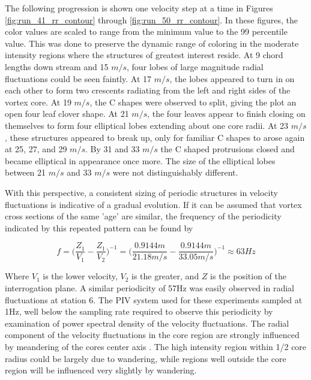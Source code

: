 The following progression is shown one velocity step at 
a time in Figures \ref{fig:run_41_rr_contour} through 
\ref{fig:run_50_rr_contour}. In these figures, the color values are scaled to 
range from the minimum value to the 99 percentile value. This was done to 
preserve the dynamic range of coloring in the moderate intensity regions where 
the structures of greatest interest reside.
At 9 chord lengths down stream and 15 $m/s$, four lobes of 
large magnitude radial fluctuations could be seen faintly. At 17 $m/s$, the 
lobes appeared to turn in on each other to form two crescents radiating from 
the left and right sides of the vortex core. At 19 $m/s$, the C shapes were 
observed to split, giving the plot an open four leaf clover shape. At 21 $m/s$, 
the four leaves appear to finish closing on themselves to form four 
elliptical lobes extending about one core radii. At 23 $m/s$, these 
structures appeared to break up, only for familiar C shapes to arose again at 
25, 27, and 29 $m/s$. By 31 and 33 $m/s$ the C shaped protrusions closed and 
became elliptical in appearance once more.  The size of the 
elliptical lobes between 21 $m/s$ and 33 $m/s$ were not distinguishably 
different. 












With this perspective, a consistent sizing of periodic structures in velocity 
fluctuations is indicative of a gradual evolution. If it can be assumed that 
vortex cross sections of the same 'age' are similar, the frequency of the 
periodicity indicated by this repeated pattern can be found by

\begin{equation}
f = \Big(\frac{Z_1}{V_1} - \frac{Z_1}{V_2}\Big)^{-1} = 
\Big(\frac{0.9144m}{21.18 m/s}-\frac{0.9144m}{33.05 m/s}\Big)^{-1} \approx 63 Hz
\label{eq:period_frequency}
\end{equation}

\noindent
Where $V_1$ is the lower velocity, $V_2$ is the greater, and $Z$ is the 
position of the interrogation plane. A similar periodicity of 57Hz was easily
observed in radial fluctuations at station 6. The PIV system used for these 
experiments sampled at 1Hz, well below the sampling rate required to observe 
this periodicity by examination of power spectral density of the velocity 
fluctuations. The radial component of the velocity fluctuations in the core 
region are strongly influenced by meandering of the cores center axis 
\cite{bandyopadhyay1991}. The 
high intensity region within 1/2 core radius could be largely due to wandering, 
while regions well outside the core region will be influenced very slightly by 
wandering.

